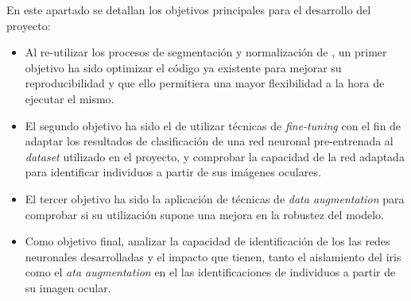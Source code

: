  \label{capitulo2}

En este apartado se detallan los objetivos principales para el desarrollo del proyecto:
\begin{itemize}
    \item Al re-utilizar los procesos de segmentación y normalización de \cite{tfg_iris_2020}, un primer objetivo ha sido optimizar el código ya existente para 
    mejorar su reproducibilidad y que ello permitiera una mayor flexibilidad a la hora de ejecutar el mismo.
    \item El segundo objetivo ha sido el de utilizar técnicas de \textit{fine-tuning} con el fin de adaptar los resultados de clasificación de una red neuronal pre-entrenada al \textit{dataset} utilizado en el proyecto, y comprobar la capacidad de la red adaptada para identificar individuos a partir de sus imágenes oculares.
    \item El tercer objetivo ha sido la aplicación de técnicas de \textit{data augmentation} para comprobar si su utilización supone una mejora en la robustez del modelo.
    \item Como objetivo final, analizar la capacidad de identificación de los las redes neuronales desarrolladas y el impacto que tienen, tanto el aislamiento del iris como el \textit{ata augmentation} en el las identificaciones de individuos a partir de su imagen ocular.                                                                                                                                                                                                           
\end{itemize}

